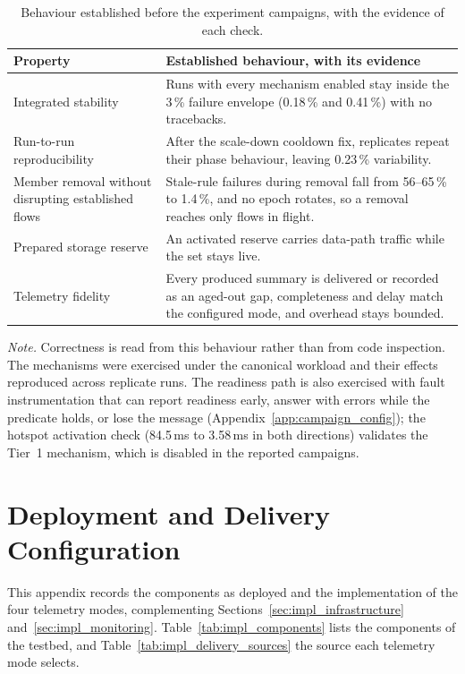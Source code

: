 ﻿\documentclass[12pt,reqno,twoside]{amsbook}
\begin{document}
{\begin{table}[H]
    \centering
    \caption{Behaviour established before the experiment campaigns, with
    the evidence of each check.}
    \label{tab:impl_validation}
    \footnotesize
    \begin{tabular}{p{} p{}}
        \toprule
        Property & Established behaviour, with its evidence \\
        \midrule
        Integrated stability & Runs with every mechanism enabled stay inside
        the 3\,\% failure envelope (0.18\,\% and 0.41\,\%) with no
        tracebacks. \\
        Run-to-run reproducibility & After the scale-down cooldown fix,
        replicates repeat their phase behaviour, leaving 0.23\,\% variability. \\
        Member removal without disrupting established flows & Stale-rule
        failures during removal fall from 56--65\,\% to 1.4\,\%, and no epoch
        rotates, so a removal reaches only flows in flight. \\
        Prepared storage reserve & An activated reserve carries data-path
        traffic while the set stays live. \\
        Telemetry fidelity & Every produced summary is delivered or recorded
        as an aged-out gap, completeness and delay match the configured mode,
        and overhead stays bounded. \\
        \bottomrule
    \end{tabular}
\end{table}
{\footnotesize\noindent\textit{Note.} Correctness is read from this behaviour
rather than from code inspection. The mechanisms were exercised under the
canonical workload and their effects reproduced across replicate runs. The
readiness path is also exercised with fault instrumentation that can report
readiness early, answer with errors while the predicate holds, or lose the
message (Appendix~\ref{app:campaign_config}); the hotspot activation check
(84.5\,ms to 3.58\,ms in both directions) validates the Tier~1 mechanism, which
is disabled in the reported campaigns.\par}

\chapter{Deployment and Delivery Configuration}\label{app:deployment}
This appendix records the components as deployed and the implementation of the
four telemetry modes, complementing
Sections~\ref{sec:impl_infrastructure} and~\ref{sec:impl_monitoring}.
Table~\ref{tab:impl_components} lists the components of the testbed, and
Table~\ref{tab:impl_delivery_sources} the source each telemetry mode selects.

}
\end{document}
